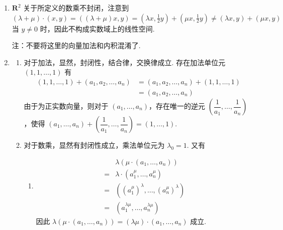 \begin{exercise}
\begin{exgroup}
\begin{answer}
\begin{enumerate}
                \item $\mathbf{R}^2$ 关于所定义的数乘不封闭，注意到 $(\lambda+\mu)\cdot(x,y)=((\lambda+\mu)x,y) = (\lambda x,\frac{1}{2}y)+(\mu x, \frac{1}{2} y) \neq (\lambda x,y)+(\mu x,y)$ 当 $y \neq 0$ 时，因此不构成实数域上的线性空间.

                注：不要将这里的向量加法和内积混淆了.

                \item \begin{enumerate}
                          \item 对于加法，显然，封闭性，结合律，交换律成立. 存在加法单位元 $(1,1,\ldots,1)$ 有
                                \begin{align*}
                                    (1,1,\ldots,1)+(a_1,a_2,\ldots,a_n) & = (a_1,a_2,\ldots,a_n)+(1,1,\ldots,1) \\
                                                                        & = (a_1,a_2,\ldots,a_n)
                                \end{align*}
                                由于为正实数向量，则对于 $(a_1,\ldots,a_n)$，存在唯一的逆元 $\left(\dfrac 1{a_1},\ldots,\dfrac 1{a_n}\right)$，使得 $(a_1,\ldots,a_n)+\left(\dfrac 1{a_1},\ldots,\dfrac 1{a_n}\right)=(1,\ldots,1)$.

                          \item 对于数乘，显然有封闭性成立，乘法单位元为 $\lambda_0=1$. 又有
                                \begin{enumerate}
                                    \item \begin{align*}
                                                  & \lambda(\mu\cdot(a_1,\ldots,a_n))            \\
                                              ={} & \lambda\cdot(a_1^\mu,\ldots,a_n^\mu)         \\
                                              ={} & ((a_1^\mu)^\lambda,\ldots,(a_n^\mu)^\lambda) \\
                                              ={} & (a_1^{\lambda\mu},\ldots,a_n^{\lambda\mu})
                                          \end{align*}
                                          因此 $\lambda(\mu\cdot(a_1,\ldots,a_n))=(\lambda\mu)\cdot(a_1,\ldots,a_n)$ 成立.


\end{enumerate}
\end{enumerate}
\end{enumerate}
\end{answer}
\end{exgroup}
\end{exercise}
